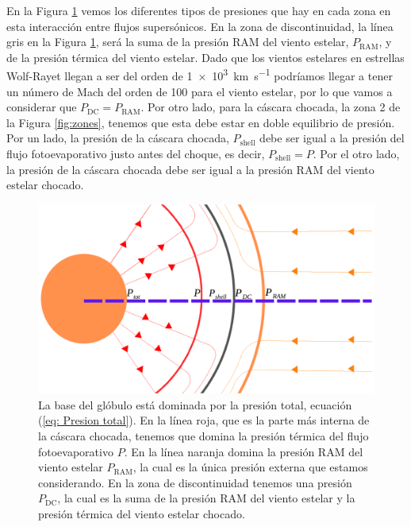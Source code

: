 \documentclass{book}
\begin{document}
En la Figura \ref{fig:zones_presiones} vemos los diferentes tipos de
presiones que hay en cada zona en esta interacción entre flujos
supersónicos. En la zona de discontinuidad, la línea gris en la Figura
\ref{fig:zones_presiones}, será la suma de la presión RAM del viento
estelar, $P_\mathrm{RAM}$, y de la presión térmica del viento estelar.
Dado que los vientos estelares en estrellas Wolf-Rayet llegan a ser
del orden de \SI{1e3}{km.s^{-1}} podríamos llegar a tener un número de
Mach del orden de 100 para el viento estelar, por lo que vamos a
considerar que $P_\mathrm{DC}=P_\mathrm{RAM}$. Por otro lado, para la
cáscara chocada, la zona 2 de la Figura \ref{fig:zones}, tenemos que
esta debe estar en doble equilibrio de presión. Por un lado, la
presión de la cáscara chocada, $P_\mathrm{shell}$ debe ser igual a la
presión del flujo fotoevaporativo justo antes del choque, es decir,
$P_\mathrm{shell}=P$. Por el otro lado, la presión de la cáscara
chocada debe ser igual a la presión RAM del viento estelar chocado.

\begin{figure}[htb]
    \centering    \includegraphics[width=\textwidth]{imagenes_corregidas/Arreglo 03.pdf}
    \caption{La base del glóbulo está dominada por la presión total,
      ecuación (\ref{eq: Presion total}). En la línea roja, que es la
      parte más interna de la cáscara chocada, tenemos que domina la
      presión térmica del flujo fotoevaporativo $P$. En la línea
      naranja domina la presión RAM del viento estelar
      $P_\mathrm{RAM}$, la cual es la única presión externa que
      estamos considerando. En la zona de discontinuidad tenemos una
      presión $P_\mathrm{DC}$, la cual es la suma de la presión RAM
      del viento estelar y la presión térmica del viento estelar
      chocado. }
    \label{fig:zones_presiones}
\end{figure}
\end{document}
